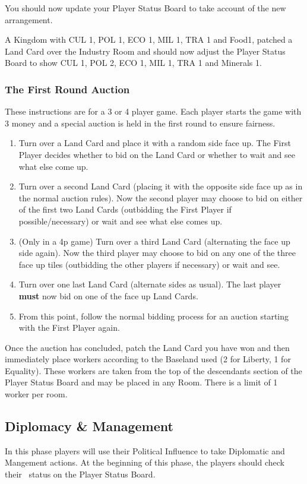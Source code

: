 \documentclass[10pt,twocolumn]{article}
\begin{document}
You should now update your Player Status Board to take account of the new arrangement.
\begin{BoxExample}
A Kingdom with CUL 1, POL 1, ECO 1, MIL 1, TRA 1 and Food1, patched a Land Card over the Industry Room and should now adjust the Player Status Board to show CUL 1, POL 2, ECO 1, MIL 1, TRA 1 and Minerals 1.
\end{BoxExample}


\subsubsection{The First Round Auction}
These instructions are for a 3 or 4 player game.
Each player starts the game with 3 money and a special auction is held in the first round to ensure fairness. 
\begin{enumerate}
\item Turn over a Land Card and place it with a random side face up. The First Player decides whether to bid on the Land Card or whether to wait and see what else come up.
\item Turn over a second Land Card (placing it with the opposite side face up as in the normal auction rules). Now the second player may choose to bid on either of the first two Land Cards (outbidding the First Player if possible/necessary) or wait and see what else comes up.
\item (Only in a 4p game) Turn over a third Land Card (alternating the face up side again). Now the third player may choose to bid on any one of the three face up tiles (outbidding the other players if necessary) or wait and see.
\item Turn over one last Land Card (alternate sides as usual). The last player \textbf{must} now bid on one of the face up Land Cards.
\item From this point, follow the normal bidding process for an auction starting with the First Player again.
\end{enumerate}
Once the auction has concluded, patch the Land Card you have won and then immediately place workers according to the Baseland used (2 for Liberty, 1 for Equality). These workers are taken from the top of the descendants section of the Player Status Board and may be placed in any Room. There is a limit of 1 worker per room.
\subsection{Diplomacy \& Management}
In this phase players will use their Political Influence to take Diplomatic and Mangement actions. At the beginning of this phase, the players should check their \pol\ status on the Player Status Board.
\end{document}

